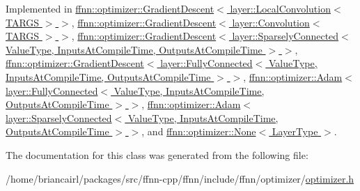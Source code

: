 Implemented in \hyperlink{classffnn_1_1optimizer_1_1_gradient_descent_3_01layer_1_1_local_convolution_3_01_t_a_r_g_s_01_4_01_4_a78a1029caa29a3f5d1548a85dac1a4dd}{ffnn\-::optimizer\-::\-Gradient\-Descent$<$ layer\-::\-Local\-Convolution$<$ T\-A\-R\-G\-S $>$ $>$}, \hyperlink{classffnn_1_1optimizer_1_1_gradient_descent_3_01layer_1_1_convolution_3_01_t_a_r_g_s_01_4_01_4_a3cbbcd9490ff52ee7984bfcb17db4ee1}{ffnn\-::optimizer\-::\-Gradient\-Descent$<$ layer\-::\-Convolution$<$ T\-A\-R\-G\-S $>$ $>$}, \hyperlink{classffnn_1_1optimizer_1_1_gradient_descent_3_01layer_1_1_sparsely_connected_3_01_value_type_00_e6c27913ab0d90f52f73031aa88c19bf_ada280929e93a2d12f0bc21e9077e75a1}{ffnn\-::optimizer\-::\-Gradient\-Descent$<$ layer\-::\-Sparsely\-Connected$<$ Value\-Type, Inputs\-At\-Compile\-Time, Outputs\-At\-Compile\-Time $>$ $>$}, \hyperlink{classffnn_1_1optimizer_1_1_gradient_descent_3_01layer_1_1_fully_connected_3_01_value_type_00_01_5f7b01db2ae4d39760d70ee323649a60_a4e15c26f4b561a8ea3ca3de3b324e1cf}{ffnn\-::optimizer\-::\-Gradient\-Descent$<$ layer\-::\-Fully\-Connected$<$ Value\-Type, Inputs\-At\-Compile\-Time, Outputs\-At\-Compile\-Time $>$ $>$}, \hyperlink{classffnn_1_1optimizer_1_1_adam_3_01layer_1_1_fully_connected_3_01_value_type_00_01_inputs_at_co08ce471fd3ee7441a350cc42cfd35bcd_ad42586e39195fc9a72057f20b657f8be}{ffnn\-::optimizer\-::\-Adam$<$ layer\-::\-Fully\-Connected$<$ Value\-Type, Inputs\-At\-Compile\-Time, Outputs\-At\-Compile\-Time $>$ $>$}, \hyperlink{classffnn_1_1optimizer_1_1_adam_3_01layer_1_1_sparsely_connected_3_01_value_type_00_01_inputs_at5101e46d32858ec2169acdeede08d723_aaa3b2eb55a9d80d51330c132df65214b}{ffnn\-::optimizer\-::\-Adam$<$ layer\-::\-Sparsely\-Connected$<$ Value\-Type, Inputs\-At\-Compile\-Time, Outputs\-At\-Compile\-Time $>$ $>$}, and \hyperlink{classffnn_1_1optimizer_1_1_none_aa2d59b906b49fb976b50a810479637fd}{ffnn\-::optimizer\-::\-None$<$ Layer\-Type $>$}.



The documentation for this class was generated from the following file\-:\begin{DoxyCompactItemize}
\item 
/home/briancairl/packages/src/ffnn-\/cpp/ffnn/include/ffnn/optimizer/\hyperlink{optimizer_8h}{optimizer.\-h}\end{DoxyCompactItemize}
